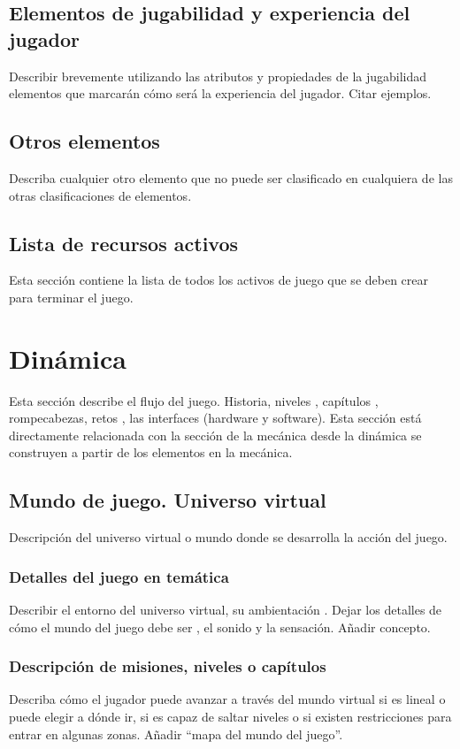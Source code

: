 \subsection{Elementos de jugabilidad y experiencia del jugador}
Describir brevemente utilizando las atributos y propiedades de la jugabilidad elementos que marcarán cómo será la experiencia del jugador. Citar ejemplos.

\subsection{Otros elementos}
Describa cualquier otro elemento que no puede ser clasificado en cualquiera de las otras clasificaciones de elementos.

\subsection{Lista de recursos activos}
Esta sección contiene la lista de todos los activos de juego que se deben crear para terminar el juego.


\section{Dinámica}
Esta sección describe el flujo del juego. Historia, niveles , capítulos , rompecabezas, retos , las interfaces (hardware y software). Esta sección está directamente relacionada con la sección de la mecánica desde la dinámica se construyen a partir de los elementos en la mecánica.

\subsection{Mundo de juego. Universo virtual}
Descripción del universo virtual o mundo donde se desarrolla la acción del juego.

\subsubsection{Detalles del juego en temática}
Describir el entorno del universo virtual, su ambientación . Dejar los detalles de cómo el mundo del juego debe ser , el sonido y la sensación. Añadir concepto.

\subsubsection{Descripción de misiones, niveles o capítulos}
Describa cómo el jugador puede avanzar a través del mundo virtual si es lineal o puede elegir a dónde ir, si es capaz de saltar niveles o si existen restricciones para entrar en algunas zonas. Añadir “mapa del mundo del juego”.

